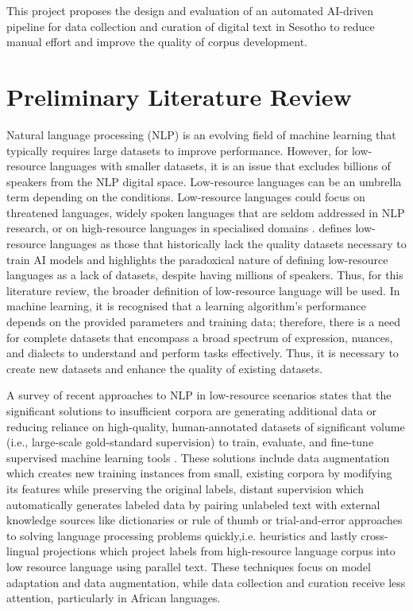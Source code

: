 \documentclass[12pt]{ThesisRU}
\begin{document}
This project proposes the design and evaluation of an automated AI-driven pipeline for data collection and curation of digital text in Sesotho to reduce manual effort and improve the quality of corpus development.


\section{Preliminary Literature Review}
\label{sec:review}

Natural language processing (NLP) is an evolving field of machine learning that typically requires large datasets to improve performance. However, for low-resource languages with smaller datasets, it is an issue that excludes billions of speakers from the NLP digital space. Low-resource languages can be an umbrella term depending on the conditions. Low-resource languages could focus on threatened languages, widely spoken languages that are seldom addressed in NLP research, or on high-resource languages in specialised domains \citep{Hedderich2021}. \citet{Shahid2025} defines low-resource languages as those that historically lack the quality datasets necessary to train AI models and highlights the paradoxical nature of defining low-resource languages as a lack of datasets, despite having millions of speakers. Thus, for this literature review, the broader definition of low-resource language will be used. In machine learning, it is recognised that a learning algorithm's performance depends on the provided parameters and training data; therefore, there is a need for complete datasets that encompass a broad spectrum of expression, nuances, and dialects to understand and perform tasks effectively. Thus, it is necessary to create new datasets and enhance the quality of existing datasets. 

A survey of recent approaches to NLP in low-resource scenarios states that the significant solutions to insufficient corpora are generating additional data or reducing reliance on high-quality, human-annotated datasets of significant volume (i.e., large-scale gold-standard supervision) to train, evaluate, and fine-tune supervised machine learning tools \citep{Hedderich2021}. These solutions include data augmentation which creates new training instances from small, existing corpora by modifying its features while preserving the original labels, distant supervision which automatically generates labeled data by pairing unlabeled text with external knowledge sources like dictionaries or rule of thumb or trial-and-error approaches to solving language processing problems quickly,i.e. heuristics and lastly cross-lingual projections which project labels from high-resource language corpus into low resource language using parallel text. These techniques focus on model adaptation and data augmentation, while data collection and curation receive less attention, particularly in African languages.
\end{document}
